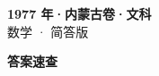 \documentclass[zihao=-4, a4paper]{ctexart}
\begin{document}
\begin{center}
  {\Large\bfseries 1977 年·内蒙古卷·文科}\\[4pt]
  {\large 数学 · 简答版}
\end{center}
\medskip
{}

\clearpage
{}
\begin{center}{\Large\bfseries 答案速查}\end{center}
\medskip

\end{document}
